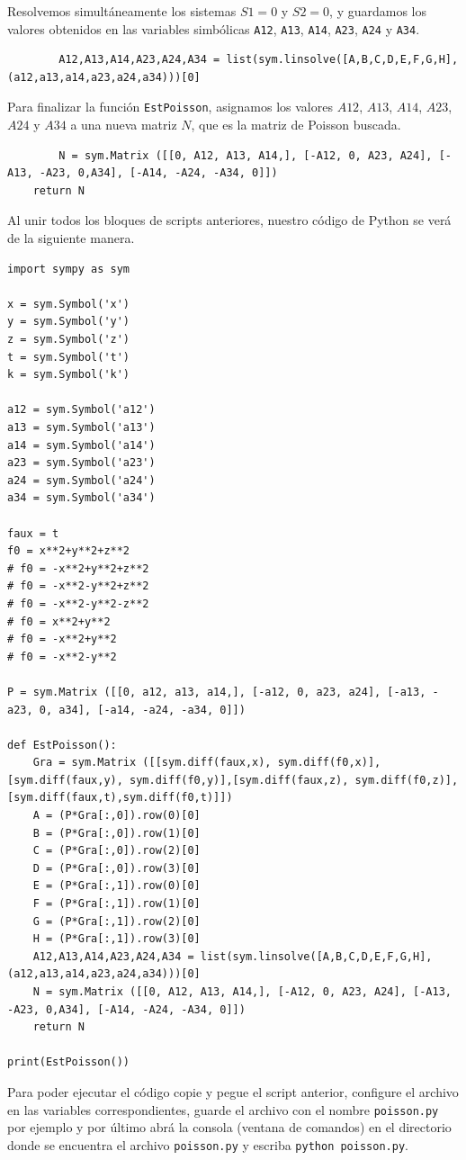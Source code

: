 \documentclass[a4paper,10pt]{book}
\begin{document}
Resolvemos simult\'aneamente los sistemas $S1=0$ y $S2=0$, y guardamos los valores obtenidos en las variables simb\'olicas \texttt{A12}, \texttt{A13}, \texttt{A14}, \texttt{A23}, \texttt{A24} y \texttt{A34}.     
\begin{lstlisting} 
        A12,A13,A14,A23,A24,A34 = list(sym.linsolve([A,B,C,D,E,F,G,H],(a12,a13,a14,a23,a24,a34)))[0]
\end{lstlisting}
Para finalizar la funci\'on \texttt{EstPoisson}, asignamos los valores $A12$, $A13$, $A14$, $A23$, $A24$ y $A34$ a una nueva matriz $N$, que es la matriz de Poisson buscada.     
\begin{lstlisting}
        N = sym.Matrix ([[0, A12, A13, A14,], [-A12, 0, A23, A24], [-A13, -A23, 0,A34], [-A14, -A24, -A34, 0]])
    return N
\end{lstlisting}
Al unir todos los bloques de scripts anteriores, nuestro c\'odigo de Python se ver\'a de la siguiente manera.   
\lstset{stepnumber=1}
\begin{lstlisting}
import sympy as sym

x = sym.Symbol('x')
y = sym.Symbol('y')
z = sym.Symbol('z')
t = sym.Symbol('t')
k = sym.Symbol('k')

a12 = sym.Symbol('a12')
a13 = sym.Symbol('a13')
a14 = sym.Symbol('a14')
a23 = sym.Symbol('a23')
a24 = sym.Symbol('a24')
a34 = sym.Symbol('a34')

faux = t
f0 = x**2+y**2+z**2
# f0 = -x**2+y**2+z**2 
# f0 = -x**2-y**2+z**2
# f0 = -x**2-y**2-z**2
# f0 = x**2+y**2
# f0 = -x**2+y**2
# f0 = -x**2-y**2

P = sym.Matrix ([[0, a12, a13, a14,], [-a12, 0, a23, a24], [-a13, -a23, 0, a34], [-a14, -a24, -a34, 0]])

def EstPoisson():
    Gra = sym.Matrix ([[sym.diff(faux,x), sym.diff(f0,x)],[sym.diff(faux,y), sym.diff(f0,y)],[sym.diff(faux,z), sym.diff(f0,z)],[sym.diff(faux,t),sym.diff(f0,t)]])
    A = (P*Gra[:,0]).row(0)[0]
    B = (P*Gra[:,0]).row(1)[0]
    C = (P*Gra[:,0]).row(2)[0]
    D = (P*Gra[:,0]).row(3)[0]
    E = (P*Gra[:,1]).row(0)[0]
    F = (P*Gra[:,1]).row(1)[0]
    G = (P*Gra[:,1]).row(2)[0]
    H = (P*Gra[:,1]).row(3)[0]
    A12,A13,A14,A23,A24,A34 = list(sym.linsolve([A,B,C,D,E,F,G,H],(a12,a13,a14,a23,a24,a34)))[0]
    N = sym.Matrix ([[0, A12, A13, A14,], [-A12, 0, A23, A24], [-A13, -A23, 0,A34], [-A14, -A24, -A34, 0]])
    return N

print(EstPoisson())
\end{lstlisting}
Para poder ejecutar el c\'odigo copie y pegue el script anterior, configure el archivo en las variables correspondientes, guarde el archivo con el nombre \texttt{poisson.py} por ejemplo y por \'ultimo abr\'a la consola (ventana de comandos) en el directorio donde se encuentra el archivo \texttt{poisson.py} y escriba \texttt{python poisson.py}.  
\end{document}
